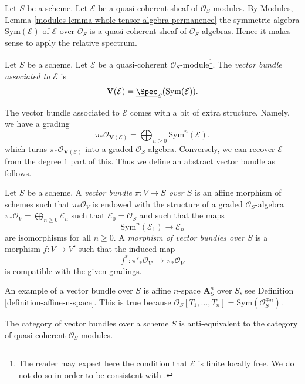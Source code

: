\noindent
Let $S$ be a scheme.
Let $\mathcal{E}$ be a quasi-coherent sheaf of $\mathcal{O}_S$-modules.
By Modules, Lemma \ref{modules-lemma-whole-tensor-algebra-permanence}
the symmetric algebra $\text{Sym}(\mathcal{E})$ of
$\mathcal{E}$ over $\mathcal{O}_S$
is a quasi-coherent sheaf of $\mathcal{O}_S$-algebras.
Hence it makes sense to apply the relative spectrum.

\begin{definition}
\label{definition-vector-bundle}
Let $S$ be a scheme. Let $\mathcal{E}$ be a quasi-coherent
$\mathcal{O}_S$-module\footnote{The reader may expect here
the condition that $\mathcal{E}$ is finite locally free. We do not
do so in order to be consistent with \cite[II, Definition 1.7.8]{EGA}.}.
The {\it vector bundle associated to $\mathcal{E}$} is
$$
\mathbf{V}(\mathcal{E}) = \underline{\Spec}_S(\text{Sym}(\mathcal{E})).
$$
\end{definition}

\noindent
The vector bundle associated to $\mathcal{E}$ comes with a bit
of extra structure. Namely, we have a grading
$$
\pi_*\mathcal{O}_{\mathbf{V}(\mathcal{E})} =
\bigoplus\nolimits_{n \geq 0} \text{Sym}^n(\mathcal{E}).
$$
which turns $\pi_*\mathcal{O}_{\mathbf{V}(\mathcal{E})}$
into a graded $\mathcal{O}_S$-algebra. Conversely, we can recover
$\mathcal{E}$ from the degree $1$ part of this.
Thus we define an abstract vector bundle as follows.

\begin{definition}
\label{definition-abstract-vector-bundle}
Let $S$ be a scheme. A {\it vector bundle $\pi : V \to S$ over $S$} is an
affine morphism of schemes such that $\pi_*\mathcal{O}_V$ is endowed with
the structure of a graded $\mathcal{O}_S$-algebra
$\pi_*\mathcal{O}_V = \bigoplus\nolimits_{n \geq 0} \mathcal{E}_n$
such that $\mathcal{E}_0 = \mathcal{O}_S$ and such that the maps
$$
\text{Sym}^n(\mathcal{E}_1) \longrightarrow \mathcal{E}_n
$$
are isomorphisms for all $n \geq 0$. A {\it morphism of vector bundles
over $S$} is a morphism $f : V \to V'$ such that the induced map
$$
f^* : \pi'_*\mathcal{O}_{V'} \longrightarrow \pi_*\mathcal{O}_V
$$
is compatible with the given gradings.
\end{definition}

\noindent
An example of a vector bundle over $S$ is affine $n$-space
$\mathbf{A}^n_S$ over $S$, see Definition \ref{definition-affine-n-space}.
This is true because
$\mathcal{O}_S[T_1, \ldots, T_n] = \text{Sym}(\mathcal{O}_S^{\oplus n})$.

\begin{lemma}
\label{lemma-category-vector-bundles}
The category of vector bundles over a scheme $S$ is
anti-equivalent to the category of quasi-coherent $\mathcal{O}_S$-modules.
\end{lemma}

